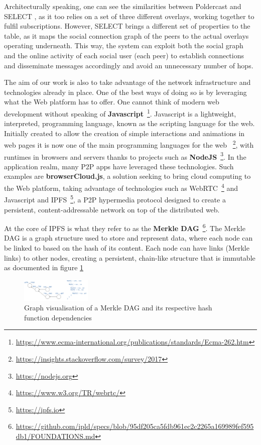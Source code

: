 Architecturally speaking, one can see the similarities between Poldercast and
SELECT \cite{Apolonia2018}, as it too relies on a set of three different
overlays, working together to fulfil subscriptions. However, SELECT brings a
different set of properties to the table, as it maps the social connection
graph of the peers to the actual overlays operating underneath. This way, the
system can exploit both the social graph and the online activity of each social
user (each peer) to establish connections and disseminate messages accordingly
and avoid an unnecessary number of hops.

The aim of our work is also to take advantage of the network infrastructure and
technologies already in place. One of the best ways of doing so is by
leveraging what the Web platform has to offer. One cannot think of modern web
development without speaking of
\textbf{Javascript}~\footnote{\url{https://www.ecma-international.org/publications/standards/Ecma-262.htm}}.
Javascript is a lightweight, interpreted, programming language, known as the
scripting language for the web. Initially created to allow the creation of
simple interactions and animations in web pages it is now one of the main
programming languages for the web
~\footnote{\url{https://insights.stackoverflow.com/survey/2017}}, with runtimes
in browsers and servers thanks to projects such as
\textbf{NodeJS}~\footnote{\url{https://nodejs.org}}. In the application realm,
many P2P apps have leveraged these technologies. Such examples are
\textbf{browserCloud.js}\cite{Dias2018}, a solution seeking to bring cloud
computing to the Web platform, taking advantage of technologies such as
WebRTC~\footnote{\url{https://www.w3.org/TR/webrtc/}} and Javascript and
IPFS~\footnote{\url{https://ipfs.io}}, a P2P hypermedia protocol designed to
create a persistent, content-addressable network on top of the distributed web.

At the core of IPFS is what they refer to as the \textbf{Merkle
DAG}~\footnote{\url{https://github.com/ipld/specs/blob/95df205ca5fdb961ec2c2265a169989fef595db1/FOUNDATIONS.md}}.
The Merkle DAG is a graph structure used to store and represent data, where
each node can be linked to based on the hash of its content. Each node can have
links (Merkle links) to other nodes, creating a persistent, chain-like
structure that is immutable as documented in figure \ref{fig:merkle-dag}

\begin{figure}[hb!]
  \centering
  \includegraphics[width=0.3\textwidth]{../images/merkle-dag.png}
  \caption{Graph visualisation of a Merkle DAG and its respective hash function dependencies}
  \label{fig:merkle-dag}
\end{figure}


